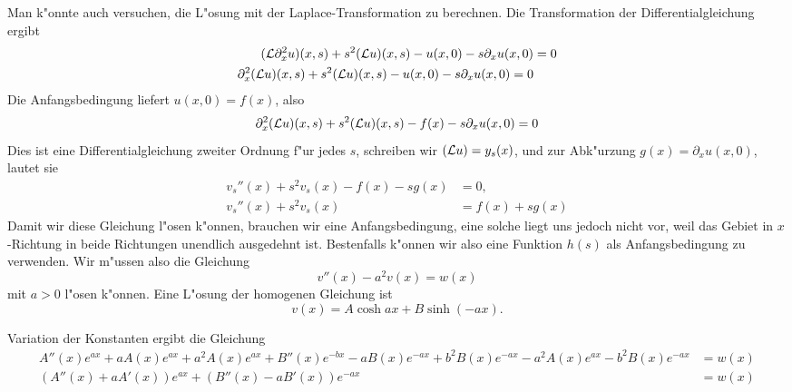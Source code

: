 \begin{loesung}
Man k"onnte auch versuchen, die L"osung mit der Laplace-Transformation
zu berechnen. Die Transformation der Differentialgleichung ergibt
\begin{align*}
({\cal L}\partial_x^2u)(x,s)
+
s^2({\cal L}u)(x, s)-u(x,0)-s\partial_xu(x,0)
&=0\\
\partial_x^2({\cal L}u)(x,s)+s^2({\cal L}u)(x, s)-u(x,0)-s\partial_xu(x,0)=0
\end{align*}
Die Anfangsbedingung liefert $u(x,0)=f(x)$, also
\[
\partial_x^2({\cal L}u)(x,s)+s^2({\cal L}u)(x, s)-f(x)-s\partial_xu(x,0)=0
\]
Dies ist eine Differentialgleichung zweiter Ordnung f"ur jedes $s$, schreiben
wir $({\cal L}u)=y_s(x)$, und zur Abk"urzung $g(x)=\partial_xu(x,0)$,
lautet sie
\begin{align*}
v_s''(x)+s^2v_s(x)-f(x)-sg(x)&=0,\\
v_s''(x)+s^2v_s(x)&=f(x)+sg(x)
\end{align*}
Damit wir diese Gleichung l"osen k"onnen, brauchen wir eine
Anfangsbedingung, eine solche liegt uns jedoch nicht vor, weil
das Gebiet in $x$-Richtung in beide Richtungen unendlich ausgedehnt
ist.
Bestenfalls k"onnen wir also eine Funktion $h(s)$ als Anfangsbedingung
zu verwenden. Wir m"ussen also die Gleichung
\[
v''(x)-a^2v(x)=w(x)
\]
mit $a>0$
l"osen k"onnen. Eine L"osung der homogenen Gleichung ist
\[
v(x)=A\cosh ax+B\sinh(-ax).
\]

Variation der Konstanten ergibt die Gleichung
\begin{align*}
A''(x)e^{ax}+aA(x)e^{ax}+a^2A(x)e^{ax}
+
B''(x)e^{-bx}-aB(x)e^{-ax}+b^2B(x)e^{-ax}
-a^2A(x)e^{ax}-b^2B(x)e^{-ax}&=w(x)
\\
(A''(x)+aA'(x))e^{ax}
+
(B''(x)-aB'(x))e^{-ax}
&=w(x)
\end{align*}
\end{loesung}

